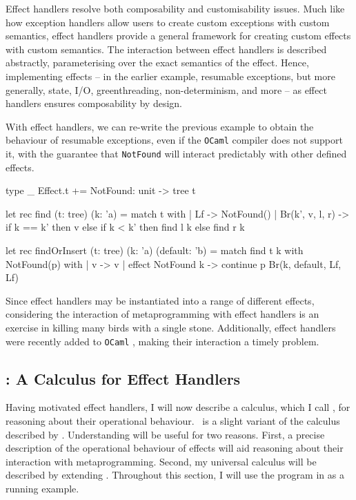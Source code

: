 Effect handlers resolve both composability and customisability issues. Much like how exception handlers allow users to create custom exceptions with custom semantics, effect handlers provide a general framework for creating custom effects with custom semantics. The interaction between effect handlers is described abstractly, parameterising over the exact semantics of the effect. Hence, implementing effects -- in the earlier example, resumable exceptions, but more generally, state, I/O, greenthreading, non-determinism, and more -- as effect handlers ensures composability by design. 

With effect handlers, we can re-write the previous example to obtain the behaviour of resumable exceptions, even if the \texttt{OCaml} compiler does not support it, with the guarantee that \texttt{NotFound} will interact predictably with other defined effects.
\begin{ocaml}
type _ Effect.t += NotFound: unit -> tree t

let rec find (t: tree) (k: 'a) = match t with 
  | Lf -> NotFound()
  | Br(k', v, l, r) -> if k == k' then v 
                      else if k < k' then find l k
                            else find r k

let rec findOrInsert (t: tree) (k: 'a) (default: 'b) = 
  match find t k with NotFound(p) with 
  | v -> v
  | effect NotFound k -> continue p Br(k, default, Lf, Lf)
\end{ocaml}
Since effect handlers may be instantiated into a range of different effects, considering the interaction of metaprogramming with effect handlers is an exercise in killing many birds with a single stone. Additionally, effect handlers were recently added to \texttt{OCaml} \citep{sivaramakrishnan-21}, making their interaction a timely problem. 
\subsection{\efflang{}: A Calculus for Effect Handlers}\label{subsection:effect-handler-calculus}
\newcommand{\print}[1]{\texttt{\textbf{print}(#1)}}
\newcommand{\readInt}[1]{\texttt{\textbf{read\_int}(#1)}}


Having motivated effect handlers, I will now describe a calculus, which I call \efflang, for reasoning about their operational behaviour.\ \efflang{} is a slight variant of the calculus described by \citet{pretnar-15}. Understanding \efflang{} will be useful for two reasons. First, a precise description of the operational behaviour of effects will aid reasoning about their interaction with metaprogramming. Second, my universal calculus will be described by extending \efflang. Throughout this section, I will use the \efflang{} program in  as a running example. 

